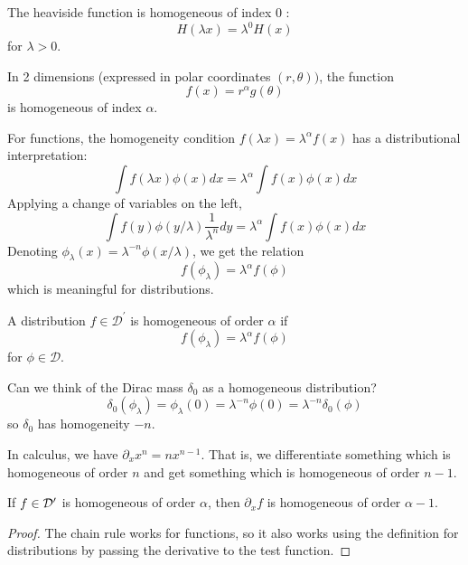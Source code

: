 \begin{example}
     The heaviside function is homogeneous of index 0 :
    $$
    H(\lambda x)=\lambda^{0} H(x)
    $$
    for $\lambda>0$.

\end{example}

\begin{example}
     In 2 dimensions (expressed in polar coordinates $(r, \theta))$, the function
    $$
    f(x)=r^{\alpha} g(\theta)
    $$
    is homogeneous of index $\alpha$.

\end{example}

For functions, the homogeneity condition $f(\lambda x)=\lambda^{\alpha} f(x)$ has a distributional interpretation:
$$
\int f(\lambda x) \phi(x) d x=\lambda^{\alpha} \int f(x) \phi(x) d x
$$
Applying a change of variables on the left,
$$
\int f(y) \phi(y / \lambda) \frac{1}{\lambda^{n}} d y=\lambda^{\alpha} \int f(x) \phi(x) d x
$$
Denoting $\phi_{\lambda}(x)=\lambda^{-n} \phi(x / \lambda)$, we get the relation
$$
f\left(\phi_{\lambda}\right)=\lambda^{\alpha} f(\phi)
$$
which is meaningful for distributions.

\begin{definition}
     A distribution $f \in \mathcal{D}^{\prime}$ is homogeneous of order $\alpha$ if
    $$
    f\left(\phi_{\lambda}\right)=\lambda^{\alpha} f(\phi)
    $$
    for $\phi \in \mathcal{D}$.
\end{definition}

\begin{example}
    Can we think of the Dirac mass $\delta_{0}$ as a homogeneous distribution?
    $$
    \delta_{0}\left(\phi_{\lambda}\right)=\phi_{\lambda}(0)=\lambda^{-n} \phi(0)=\lambda^{-n} \delta_{0}(\phi)
    $$
    so $\delta_{0}$ has homogeneity $-n$.

\end{example}
In calculus, we have $\partial_{x} x^{n}=n x^{n-1}$. That is, we differentiate something which is homogeneous of order $n$ and get something which is homogeneous of order $n-1$.

\begin{proposition}
If $f\in \mathcal{D}'$ is homogeneous of order $\alpha$, then $\partial_x f$ is homogeneous of order $\alpha-1$.
\end{proposition}
\begin{proof}
    The chain rule works for functions, so it also works using the definition for distributions by passing the derivative to the test function.
\end{proof}

